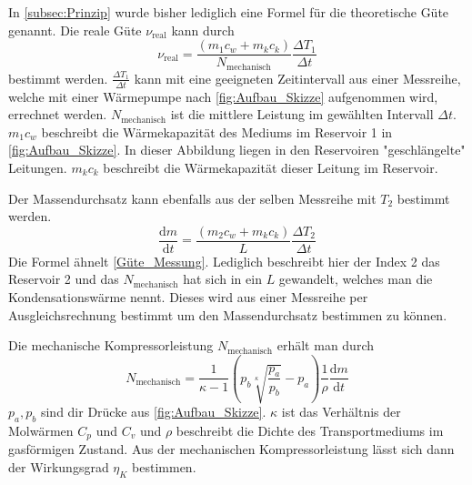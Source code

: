 In \autoref{subsec:Prinzip} wurde bisher lediglich eine Formel für die theoretische Güte genannt. Die reale Güte $\nu_{\text{real}}$ kann durch 
\begin{equation}
    \label{eqn:Güte_Messung}
    \nu_{\text{real}} = \frac{\left(m_1 c_w + m_k c_k\right)}{N_{\text{mechanisch}}}\frac{\Delta T_1}{\Delta t}
\end{equation}
bestimmt werden. $\frac{\Delta T_1}{\Delta t}$ kann mit eine geeigneten Zeitintervall aus einer Messreihe, welche mit einer Wärmepumpe nach \autoref{fig:Aufbau_Skizze} aufgenommen wird,
errechnet werden. $N_{\text{mechanisch}}$ ist die mittlere Leistung im gewählten Intervall $\Delta t$. $m_1c_w$ beschreibt die Wärmekapazität des Mediums im Reservoir 1 in \autoref{fig:Aufbau_Skizze}. In dieser Abbildung 
liegen in den Reservoiren "geschlängelte" Leitungen. $m_kc_k$ beschreibt die Wärmekapazität dieser Leitung im Reservoir. 


Der Massendurchsatz kann ebenfalls aus der selben Messreihe mit $T_2$ bestimmt werden. 
\begin{equation}
    \label{eqn:Massendurchsatz}
    \frac{\text{d}m}{\text{d}t} = \frac{\left(m_2 c_w + m_k c_k\right)}{L}\frac{\Delta T_2}{\Delta t}
\end{equation}
Die Formel ähnelt \autoref{Güte_Messung}. Lediglich beschreibt hier der Index 2 das Reservoir 2 und das $N_{\text{mechanisch}}$ hat sich in ein $L$ gewandelt, welches man die Kondensationswärme nennt.
Dieses wird aus einer Messreihe per Ausgleichsrechnung bestimmt um den Massendurchsatz bestimmen zu können.


Die mechanische Kompressorleistung $N_{\text{mechanisch}}$ erhält man durch
\begin{equation}
    \label{eqn:Leistung}
    N_{\text{mechanisch}} = \frac{1}{\kappa - 1}\left(p_b \sqrt[\kappa]{\frac{p_a}{p_b}} - p_a \right) \frac{1}{\rho} \frac{\text{d}m}{\text{d}t}
\end{equation}
$p_a, p_b$ sind dir Drücke aus \autoref{fig:Aufbau_Skizze}. $\kappa$ ist das Verhältnis der Molwärmen $C_p$ und $C_v$ und $\rho$ beschreibt die Dichte des Transportmediums im gasförmigen
Zustand. Aus der mechanischen Kompressorleistung lässt sich dann der Wirkungsgrad $\eta_K$ bestimmen.